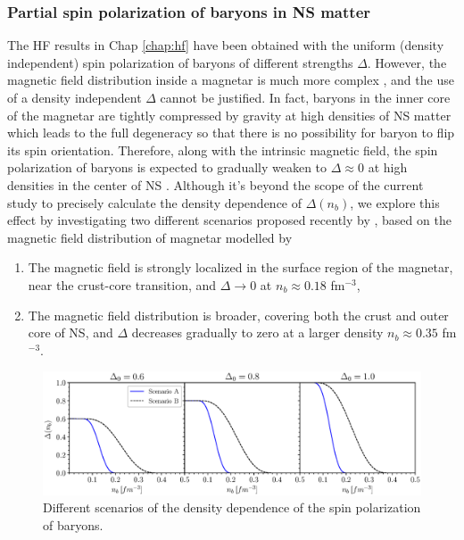 \subsubsection*{Partial spin polarization of baryons in NS matter}
The \gls{HF} results in Chap \ref{chap:hf} have been obtained with the uniform (density independent)  
spin polarization of baryons of different strengths $\Delta$. However, the magnetic 
field distribution inside a magnetar is much more complex \citep{fujisawa2014magnetic}, 
and the use of a density independent $\Delta$ cannot be justified. In fact, baryons in the 
inner core of the magnetar are tightly compressed by gravity at high densities of \gls{NS} matter
which leads to the full degeneracy so that there is no possibility for baryon to flip 
its spin orientation. Therefore, along with the intrinsic magnetic field, the spin 
polarization of baryons is expected to gradually weaken to $\Delta \approx 0$ at high
densities in the center of \gls{NS} \citep{fujisawa2014magnetic,tan2020spin}. Although it's beyond 
the scope of the current study to precisely calculate the density dependence of $\Delta(n_b)$, 
we explore this effect by investigating two different scenarios proposed recently by
\cite{tan2020spin}, based on the magnetic field distribution of magnetar modelled by 
\cite{fujisawa2014magnetic}
\begin{enumerate}[label=(\Alph*)]
    \item The magnetic field is strongly localized in the surface region of the magnetar, 
		near the crust-core transition, and $\Delta\to 0$ at $n_b\approx 0.18$ fm$^{-3}$,
    \item The magnetic field distribution is broader, covering both the crust and outer 
        core of \gls{NS}, and $\Delta$ decreases gradually to zero at a larger density 
		$n_b \approx 0.35$ fm$^{-3}$. 
\end{enumerate}
\begin{figure}[ht!]
    \centering
    \includegraphics[width=\textwidth]{fig/Delta.eps}
    \caption{Different scenarios of the density dependence of the spin polarization 
		of baryons.}
    \label{fig:Delta}
\end{figure} 
